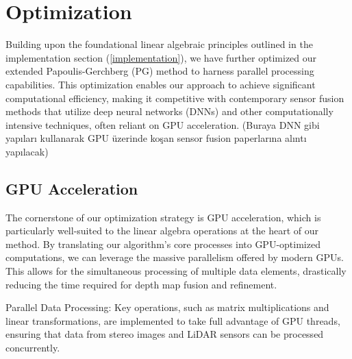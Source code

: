 \documentclass[conference]{IEEEtran}
\begin{document}


\section{Optimization}

Building upon the foundational linear algebraic principles outlined in the implementation section (\ref{implementation}), we have further optimized our extended Papoulis-Gerchberg (PG) method to harness parallel processing capabilities. This optimization enables our approach to achieve significant computational efficiency, making it competitive with contemporary sensor fusion methods that utilize deep neural networks (DNNs) and other computationally intensive techniques, often reliant on GPU acceleration.
(Buraya DNN gibi yapıları kullanarak GPU üzerinde koşan sensor fusion paperlarına alıntı yapılacak)

\subsection{GPU Acceleration}

The cornerstone of our optimization strategy is GPU acceleration, which is particularly well-suited to the linear algebra operations at the heart of our method. By translating our algorithm's core processes into GPU-optimized computations, we can leverage the massive parallelism offered by modern GPUs. This allows for the simultaneous processing of multiple data elements, drastically reducing the time required for depth map fusion and refinement.

Parallel Data Processing: Key operations, such as matrix multiplications and linear transformations, are implemented to take full advantage of GPU threads, ensuring that data from stereo images and LiDAR sensors can be processed concurrently.
\end{document}
